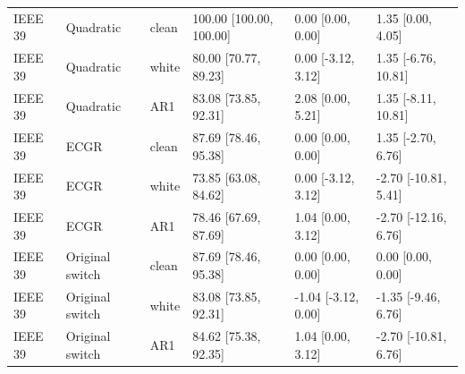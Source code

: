 \documentclass[10pt]{article}
\begin{document}
\begin{longtable}{@{}llllll@{}}
IEEE 39 & Quadratic & clean & 100.00 [100.00, 100.00] & 0.00 [0.00, 0.00] & 1.35 [0.00, 4.05] \\
IEEE 39 & Quadratic & white & 80.00 [70.77, 89.23] & 0.00 [-3.12, 3.12] & 1.35 [-6.76, 10.81] \\
IEEE 39 & Quadratic & AR1 & 83.08 [73.85, 92.31] & 2.08 [0.00, 5.21] & 1.35 [-8.11, 10.81] \\
IEEE 39 & ECGR & clean & 87.69 [78.46, 95.38] & 0.00 [0.00, 0.00] & 1.35 [-2.70, 6.76] \\
IEEE 39 & ECGR & white & 73.85 [63.08, 84.62] & 0.00 [-3.12, 3.12] & -2.70 [-10.81, 5.41] \\
IEEE 39 & ECGR & AR1 & 78.46 [67.69, 87.69] & 1.04 [0.00, 3.12] & -2.70 [-12.16, 6.76] \\
IEEE 39 & Original switch & clean & 87.69 [78.46, 95.38] & 0.00 [0.00, 0.00] & 0.00 [0.00, 0.00] \\
IEEE 39 & Original switch & white & 83.08 [73.85, 92.31] & -1.04 [-3.12, 0.00] & -1.35 [-9.46, 6.76] \\
IEEE 39 & Original switch & AR1 & 84.62 [75.38, 92.35] & 1.04 [0.00, 3.12] & -2.70 [-10.81, 6.76] \\
\bottomrule\end{longtable}\endgroup\begingroup\footnotesize\setlength{\tabcolsep}{4pt}
\end{document}
